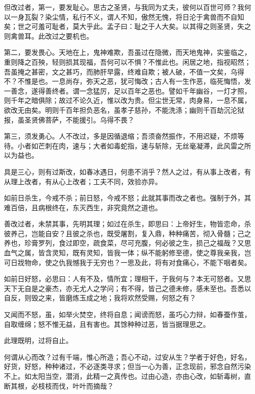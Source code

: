 \documentclass[12pt,twoside,openany]{book}
\begin{document}
但改过者，第一，要发耻心。思古之圣贤，与我同为丈夫，彼何以百世可师？我何以一身瓦裂？染尘情，私行不义，谓人不知，傲然无愧，将日沦于禽兽而不自知矣；世之可羞可耻者，莫大乎此。孟子曰：耻之于人大矣。以其得之则圣贤，失之则禽兽耳。此改过之要机也。

第二，要发畏心。天地在上，鬼神难欺，吾虽过在隐微，而天地鬼神，实鉴临之，重则降之百殃，轻则损其现福，吾何可以不惧？不惟此也。闲居之地，指视昭然；吾虽掩之甚密，文之甚巧，而肺肝早露，终难自欺；被人破，不值一文矣，乌得不？不惟是也。一息尚存，弥天之恶，犹可悔改；古人有一生作恶，临死悔悟，发一善念，遂得善终者。谓一念猛厉，足以百年之恶也。譬如千年幽谷，一灯才照，则千年之暗俱除；故过不论久近，惟以改为贵。但尘世无常，肉身易，一息不属，欲改无由矣。明则千百年担负恶名，虽孝子慈孙，不能洗涤；幽则千百劫沉沦狱报，虽圣贤佛菩萨，不能援引。乌得不畏？

第三，须发勇心。人不改过，多是因循退缩；吾须奋然振作，不用迟疑，不烦等待。小者如芒刺在肉，速与；大者如毒蛇指，速与斩除，无丝毫凝滞，此风雷之所以为益也。

具是三心，则有过斯改，如春冰遇日，何患不消乎？然人之过，有从事上改者，有从理上改者，有从心上改者；工夫不同，效验亦异。

如前日杀生，今戒不杀；前日怒，今戒不怒；此就其事而改之者也。强制于外，其难百倍，且病根终在，东灭西生，非究竟然之道也。

善改过者，未禁其事，先明其理；如过在杀生，即思曰：上帝好生，物皆恋命，杀彼养己，岂能自安？且彼之杀也，既受屠割，复入鼎，种种痛苦，彻入骨髓；己之养也，珍膏罗列，食过即空，疏食菜，尽可充腹，何必彼之生，损己之福哉？又思血气之属，皆含灵知，既有灵知，皆我一体；纵不能躬修至德，使之尊我亲我，岂可日戕物命，使之仇我憾我于无穷也？一思及此，将有对食痛心，不能下咽者矣。

如前日好怒，必思曰：人有不及，情所宜；理相干，于我何与？本无可怒者。又思天下无自是之豪杰，亦无尤人之学问；有不得，皆己之德未修，感未至也。吾悉以自反，则毁之来，皆磨炼玉成之地；我将欢然受赐，何怒之有？

又闻而不怒，虽，如举火焚空，终将自息；闻谤而怒，虽巧心力辩，如春蚕作茧，自取缠绵；怒不惟无益，且有害也。其馀种种过恶，皆当据理思之。

此理既明，过将自止。

何谓从心而改？过有千端，惟心所造；吾心不动，过安从生？学者于好色，好名，好货，好怒，种种诸过，不必逐类寻求；但当一心为善，正念现前，邪念自然污染不上。如太阳当空，潜消，此精一之真传也。过由心造，亦由心改，如斩毒树，直断其根，必枝枝而伐，叶叶而摘哉？
\end{document}
